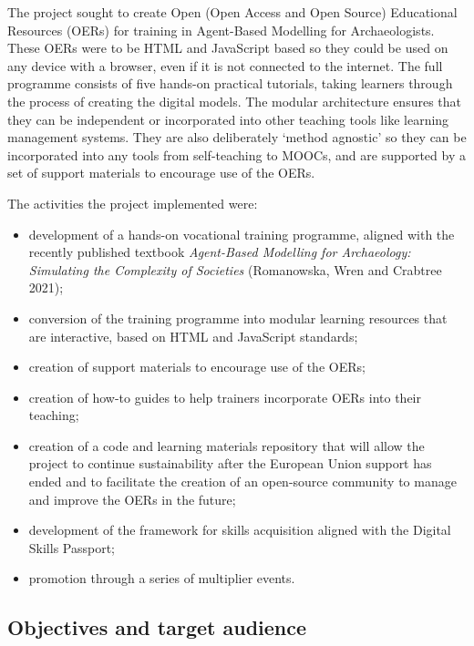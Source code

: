 \documentclass[
]{article}
\begin{document}
The project sought to create Open (Open Access and Open Source) Educational Resources (OERs) for training in Agent-Based Modelling for Archaeologists. These OERs were to be HTML and JavaScript based so they could be used on any device with a browser, even if it is not connected to the internet. The full programme consists of five hands-on practical tutorials, taking learners through the process of creating the digital models. The modular architecture ensures that they can be independent or incorporated into other teaching tools like learning management systems. They are also deliberately `method agnostic' so they can be incorporated into any tools from self-teaching to MOOCs, and are supported by a set of support materials to encourage use of the OERs.

The activities the project implemented were:

\begin{itemize}
\item
  development of a hands-on vocational training programme, aligned with the recently published textbook \emph{Agent-Based Modelling for Archaeology: Simulating the Complexity of Societies} (Romanowska, Wren and Crabtree 2021);
\item
  conversion of the training programme into modular learning resources that are interactive, based on HTML and JavaScript standards;
\item
  creation of support materials to encourage use of the OERs;
\item
  creation of how-to guides to help trainers incorporate OERs into their teaching;
\item
  creation of a code and learning materials repository that will allow the project to continue sustainability after the European Union support has ended and to facilitate the creation of an open-source community to manage and improve the OERs in the future;
\item
  development of the framework for skills acquisition aligned with the Digital Skills Passport;
\item
  promotion through a series of multiplier events.
\end{itemize}

\hypertarget{objectives-and-target-audience}{%
\subsection{Objectives and target audience}\label{objectives-and-target-audience}}
\end{document}
